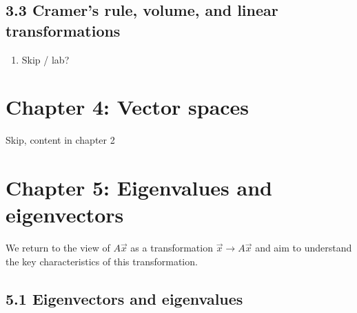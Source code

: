 \documentclass{article}
\begin{document}
\subsection{3.3 Cramer's rule, volume, and linear transformations}

\begin{enumerate}

\item Skip / lab?

\end{enumerate}


\section{Chapter 4: Vector spaces} 

Skip, content in chapter 2

\section{Chapter 5: Eigenvalues and eigenvectors} 

We return to the view of $A\vec{x}$ as a transformation $\vec{x} \rightarrow A\vec{x}$ and aim to understand the key characteristics of this transformation. 

\subsection{5.1 Eigenvectors and eigenvalues}
\end{document}
